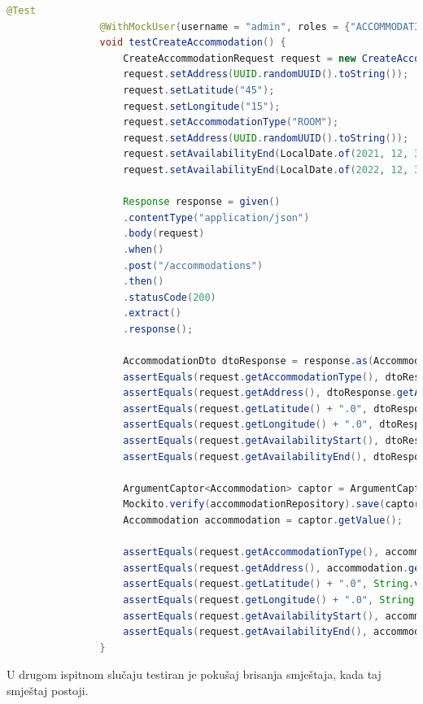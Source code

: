			\begin{lstlisting}[language=Java]
				@Test
				@WithMockUser(username = "admin", roles = {"ACCOMMODATION", "TRANSPORT", "PATIENT"})
				void testCreateAccommodation() {
					CreateAccommodationRequest request = new CreateAccommodationRequest();
					request.setAddress(UUID.randomUUID().toString());
					request.setLatitude("45");
					request.setLongitude("15");
					request.setAccommodationType("ROOM");
					request.setAddress(UUID.randomUUID().toString());
					request.setAvailabilityEnd(LocalDate.of(2021, 12, 31));
					request.setAvailabilityEnd(LocalDate.of(2022, 12, 31));
					
					Response response = given()
					.contentType("application/json")
					.body(request)
					.when()
					.post("/accommodations")
					.then()
					.statusCode(200)
					.extract()
					.response();
					
					AccommodationDto dtoResponse = response.as(AccommodationDto.class);
					assertEquals(request.getAccommodationType(), dtoResponse.getAccommodationType().toString());
					assertEquals(request.getAddress(), dtoResponse.getAddress());
					assertEquals(request.getLatitude() + ".0", dtoResponse.getLatitude());
					assertEquals(request.getLongitude() + ".0", dtoResponse.getLongitude());
					assertEquals(request.getAvailabilityStart(), dtoResponse.getAvailabilityStart());
					assertEquals(request.getAvailabilityEnd(), dtoResponse.getAvailabilityEnd());
					
					ArgumentCaptor<Accommodation> captor = ArgumentCaptor.forClass(Accommodation.class);
					Mockito.verify(accommodationRepository).save(captor.capture());
					Accommodation accommodation = captor.getValue();
					
					assertEquals(request.getAccommodationType(), accommodation.getAccommodationType().toString());
					assertEquals(request.getAddress(), accommodation.getAddress());
					assertEquals(request.getLatitude() + ".0", String.valueOf(accommodation.getLocation().getY()));
					assertEquals(request.getLongitude() + ".0", String.valueOf(accommodation.getLocation().getX()));
					assertEquals(request.getAvailabilityStart(), accommodation.getAvailabilityStart());
					assertEquals(request.getAvailabilityEnd(), accommodation.getAvailabilityEnd());
				}
			\end{lstlisting}
			
			U drugom ispitnom slučaju testiran je pokušaj brisanja smještaja, kada taj smještaj postoji.
			
